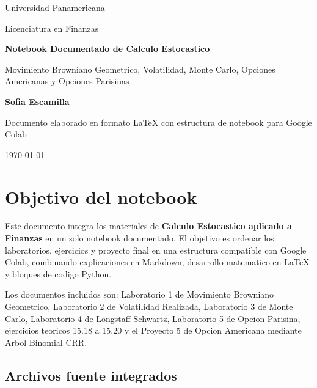 \documentclass[12pt,a4paper]{article}
\begin{document}
\begin{titlepage}
    \centering
    \vspace*{2cm}
    {\Large Universidad Panamericana \par}
    \vspace{0.5cm}
    {\large Licenciatura en Finanzas \par}
    \vspace{2cm}
    {\Huge\bfseries Notebook Documentado de Calculo Estocastico \par}
    \vspace{0.5cm}
    {\Large Movimiento Browniano Geometrico, Volatilidad, Monte Carlo, Opciones Americanas y Opciones Parisinas \par}
    \vspace{2cm}
    {\Large \textbf{Sofia Escamilla} \par}
    \vfill
    {\large Documento elaborado en formato \LaTeX{} con estructura de notebook para Google Colab \par}
    {\large \today \par}
\end{titlepage}

\tableofcontents
\newpage

\section{Objetivo del notebook}

\begin{markdowncell}
Este documento integra los materiales de \textbf{Calculo Estocastico aplicado a Finanzas} en un solo notebook documentado. 
El objetivo es ordenar los laboratorios, ejercicios y proyecto final en una estructura compatible con Google Colab, combinando explicaciones en Markdown, desarrollo matematico en \LaTeX{} y bloques de codigo Python.

Los documentos incluidos son: Laboratorio 1 de Movimiento Browniano Geometrico, Laboratorio 2 de Volatilidad Realizada, Laboratorio 3 de Monte Carlo, Laboratorio 4 de Longstaff-Schwartz, Laboratorio 5 de Opcion Parisina, ejercicios teoricos 15.18 a 15.20 y el Proyecto 5 de Opcion Americana mediante Arbol Binomial CRR.
\end{markdowncell}

\subsection{Archivos fuente integrados}
\end{document}
